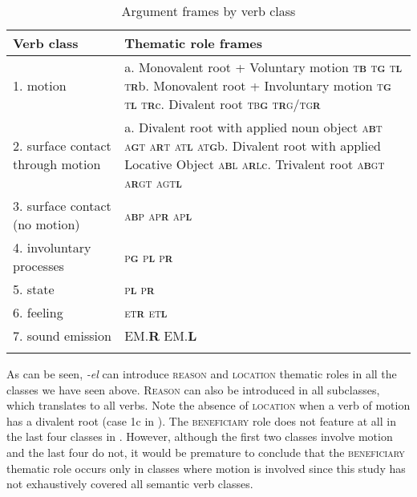 \documentclass[output=paper]{langsci/langscibook}
\begin{document}
\begin{table}
\caption{Argument frames by verb class}
\label{tab:sibanda:2}

\begin{tabularx}{\textwidth}{XX}
\lsptoprule
{Verb class} & {Thematic role frames}\\
\midrule
{1. motion} & {a. Monovalent root + Voluntary motion} {\textsc{t}\textbf{\textsc{b}} \textsc{t}\textbf{\textsc{g}} \textsc{t}\textbf{\textsc{l}} \textsc{t}\textbf{\textsc{r}}}{b. Monovalent root + Involuntary motion} {\textsc{t}\textbf{\textsc{g}} \textsc{t}\textbf{\textsc{l}} \textsc{t}\textbf{\textsc{r}}}{c. Divalent root} {\textsc{tb}\textbf{\textsc{g}} \textsc{t}\textbf{\textsc{r}}\textsc{g/tg}\textbf{\textsc{r}} \textsc{}}\\
{2. surface contact through motion} & {a. Divalent root with applied noun object} {\textsc{a}\textbf{\textsc{b}}\textsc{t a}\textbf{\textsc{g}}\textsc{t a}\textbf{\textsc{r}}\textsc{t at}\textbf{\textsc{l}} \textsc{at}\textbf{\textsc{g}}}{b. Divalent root with applied Locative Object} {\textsc{a}\textbf{\textsc{b}}\textsc{l a}\textbf{\textsc{r}}\textsc{l}}{c. Trivalent root} {\textsc{a}\textbf{\textsc{b}}\textsc{gt a}\textbf{\textsc{r}}\textsc{gt agt}\textbf{\textsc{l}}}\\
{3. surface contact (no motion)} & {\textsc{a}\textbf{\textsc{b}}\textsc{p ap}\textbf{\textsc{r}} \textsc{ap}\textbf{\textsc{l}}}\\
{4. involuntary processes}  & {\textsc{p}\textbf{\textsc{g}} \textsc{p}\textbf{\textsc{l}} \textsc{p}\textbf{\textsc{r}}}\\
{5. state} & {\textsc{p}\textbf{\textsc{l}} \textsc{p}\textbf{\textsc{r}}}\\
{6. feeling} & {\textsc{et}\textbf{\textsc{r}} \textsc{et}\textbf{\textsc{l}}}\\
{7. sound emission}  & {\textsc{EM.}\textbf{\textsc{R}} \textsc{EM.}\textbf{\textsc{L}}}\\
\lspbottomrule
\end{tabularx}

\end{table}

As can be seen, \textit{-el} can introduce \textsc{reason} and \textsc{location} thematic roles in all the classes we have seen above. \textsc{Reason} can also be introduced in all subclasses, which translates to all verbs. Note the absence of \textsc{location} when a verb of motion has a divalent root (case 1c in ). The \textsc{beneficiary} role does not feature at all in the last four classes in . However, although the first two classes involve motion and the last four do not, it would be premature to conclude that the \textsc{beneficiary} thematic role occurs only in classes where motion is involved since this study has not exhaustively covered all semantic verb classes.
\end{document}

